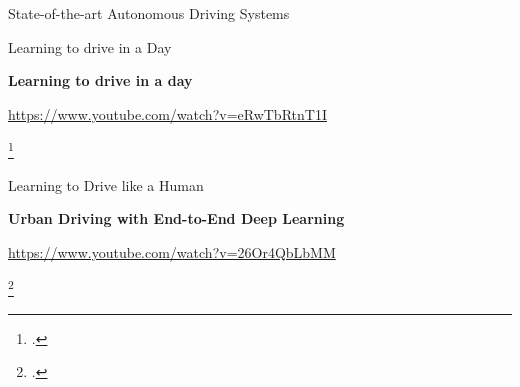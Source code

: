 \documentclass[aspectratio=169,handout]{beamer}
\begin{document}
\begin{frame}{State-of-the-art Autonomous Driving Systems}
\begin{center}
{}
	\end{center}
\end{frame}

\begin{frame}{Learning to drive in a Day}
	
	\alert{\textbf{Learning to drive in a day}}
	
	\url{https://www.youtube.com/watch?v=eRwTbRtnT1I}
	
	\footcite*{kendall2018learning}
	
	\centering

\end{frame}

\begin{frame}{Learning to Drive like a Human}
	
	\alert{\textbf{Urban Driving with End-to-End Deep Learning}}
	
	\url{https://www.youtube.com/watch?v=26Or4QbLbMM}
	
	\footcite*{wayve2019human}
	
	\centering

\end{frame}
\end{document}
